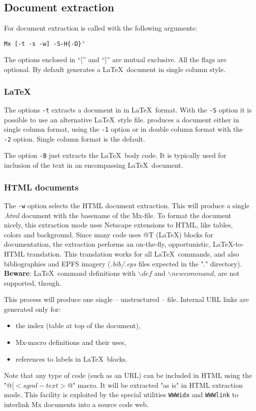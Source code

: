 \subsection{Document extraction}

For document extraction \Mx is called with the following arguments:

\noindent
\begin{center}
	{\tt Mx [-t -s -w] -S\file [-1 -2] -H\n [-B]  \{-D\macro\}$^+$\mxfile}
\end{center}

The options enclosed in ``['' and ``]'' are mutual exclusive. 
All the flags are optional. By default \Mx generates a \LaTeX\
document in single column style.

\subsubsection{\LaTeX}
The options {\tt -t} extracts a document in in \LaTeX\ format.
With the {\tt -S\file} option
it is possible to use an alternative \LaTeX\ style file. 
\Mx produces a document either in single column format, using the
{\tt -1} option or in double column format with the {\tt -2} option.
Single column format is the default.

The option {\tt -B} just extracts the \LaTeX\ body code.
It is typically used for inclusion of the text in an encompassing
\LaTeX\ document.

\subsubsection{HTML documents}
The {\tt -w} option selects the HTML document extraction. This will
produce a single {\em .html} document with the basename of the Mx-file. To
format the document nicely, this extraction mode uses Netscape extensions
to HTML, like tables, colors and background.  Since many code uses @T 
(\LaTeX) blocks for documentation, the extraction performs an on-the-fly,
opportunistic, \LaTeX-to-HTML translation. This translation
works for all \LaTeX\ commands, and also bibliographies and EPFS imagery
({\em .bib/.eps} files expected in the "." directory). {\bf Beware}:
\LaTeX\ command definitions with $\backslash def$ and
$\backslash newcommand$, are not supported, though.

This process will produce one single -- unstructured -- file. Internal
URL links are generated only for: 
\begin{itemize}
\item the index (table at top of the document),
\item Mx-macro definitions and their uses, 
\item references to labels in \LaTeX\ blocks.
\end{itemize}
Note that any type of code (such as an URL) can be included in HTML
using the "@[$<sgml-text>$@" macro. It will be extracted "as is" in HTML
extraction mode. This facility is exploited by the special utilities 
{\tt WWWidx} and {\tt WWWlink} to interlink Mx documents into a source code
web.

